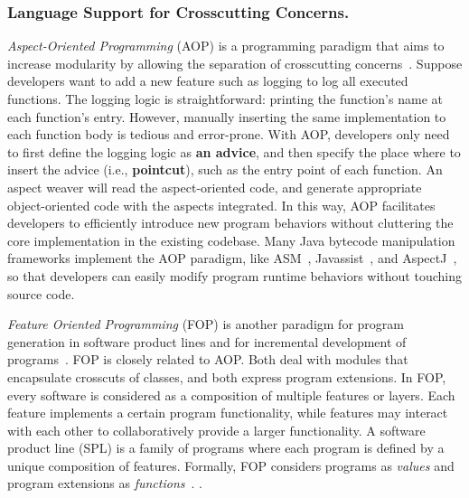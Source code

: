 \subsubsection{Language Support for Crosscutting Concerns.}
{\it Aspect-Oriented Programming} (AOP) is a programming paradigm that aims to increase modularity by allowing the separation of crosscutting concerns~\cite{aspectj}. Suppose developers want to add a new feature such as logging to log all executed functions. The logging logic is straightforward: printing the function's name at each function's entry. However, manually inserting the same implementation to each function body is tedious and error-prone. With AOP, developers only need to first define the logging logic as \textbf{an advice}, and then specify the place where to insert the advice (i.e., \textbf{pointcut}), such as the entry point of each function. An aspect weaver will read the aspect-oriented code, and generate appropriate object-oriented code with the aspects integrated. In this way, AOP facilitates developers to efficiently introduce new program behaviors without cluttering the core implementation in the existing codebase. Many Java bytecode manipulation frameworks implement the AOP paradigm, like ASM~\cite{asm}, Javassist~\cite{javassist}, and AspectJ~\cite{aspectj}, so that developers can easily modify program runtime behaviors without touching source code. 

{\it Feature Oriented Programming} (FOP) is another paradigm for program generation in software product lines and for incremental development of programs~\cite{Batory1992:DIH}. FOP is closely related to AOP. Both deal with modules that encapsulate crosscuts of classes, and both express program extensions. In FOP, every software is considered as a composition of multiple features or layers. Each feature implements a certain program functionality, while features may interact with each other to collaboratively provide a larger functionality. A software product line (SPL) is a family of programs where each program is defined by a unique composition of features. Formally, FOP considers programs as \emph{values} and program extensions as \emph{functions}~\cite{Lammel2013:fop}. .  
  
